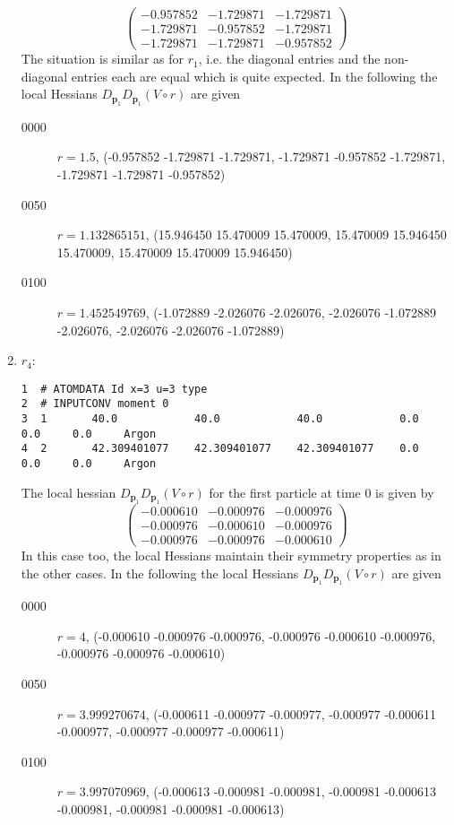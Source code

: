 \documentclass[a4paper]{article}
\newcommand{\boldp}{\boldsymbol{p}}
\begin{document}
\begin{enumerate}
\[\begin{pmatrix}
-0.957852 & -1.729871 & -1.729871\\
-1.729871 & -0.957852 & -1.729871\\
-1.729871 & -1.729871 & -0.957852
\end{pmatrix}\]
The situation is similar as for \(r_1\), i.e. the diagonal entries and the non-diagonal entries each are equal which is quite expected.
In the following the local Hessians \(D_{\boldp_1} D_{\boldp_1} (V\circ r)\) are given
\begin{description}
\item[{0000}] \(r = 1.5\), (-0.957852 -1.729871 -1.729871, -1.729871 -0.957852 -1.729871, -1.729871 -1.729871 -0.957852)
\item[{0050}] \(r = 1.132865151\), (15.946450 15.470009 15.470009, 15.470009 15.946450 15.470009, 15.470009 15.470009 15.946450)
\item[{0100}] \(r = 1.452549769\), (-1.072889 -2.026076 -2.026076, -2.026076 -1.072889 -2.026076, -2.026076 -2.026076 -1.072889)
\end{description}
\item \(r_4\):
\label{sec-1-4-4-5}
\begin{verbatim}
1  # ATOMDATA Id x=3 u=3 type
2  # INPUTCONV moment 0
3  1       40.0            40.0            40.0            0.0     0.0     0.0     Argon
4  2       42.309401077    42.309401077    42.309401077    0.0     0.0     0.0     Argon
\end{verbatim}
The local hessian \(D_{\boldp_1} D_{\boldp_1} (V\circ r)\) for the first particle at time 0 is given by
\[\begin{pmatrix}
-0.000610 & -0.000976 & -0.000976\\
-0.000976 & -0.000610 & -0.000976\\
-0.000976 & -0.000976 & -0.000610
\end{pmatrix}\]
In this case too, the local Hessians maintain their symmetry properties as in the other cases.
In the following the local Hessians \(D_{\boldp_1} D_{\boldp_1} (V\circ r)\) are given
\begin{description}
\item[{0000}] \(r = 4\), (-0.000610 -0.000976 -0.000976, -0.000976 -0.000610 -0.000976, -0.000976 -0.000976 -0.000610)
\item[{0050}] \(r = 3.999270674\), (-0.000611 -0.000977 -0.000977, -0.000977 -0.000611 -0.000977, -0.000977 -0.000977 -0.000611)
\item[{0100}] \(r = 3.997070969\), (-0.000613 -0.000981 -0.000981, -0.000981 -0.000613 -0.000981, -0.000981 -0.000981 -0.000613)

\end{description}
\end{enumerate}
\end{document}

